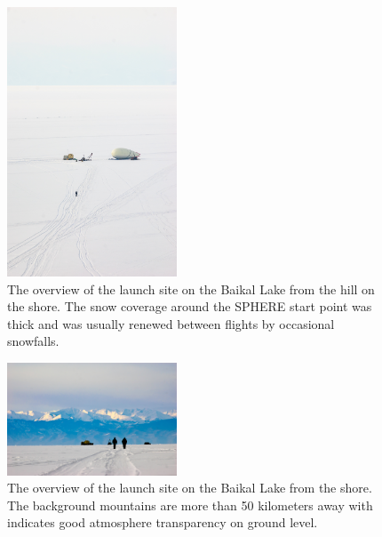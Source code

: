 \documentclass[final,5p,times,twocolumn]{elsarticle}
\begin{document}

\begin{figure}[tb]
\begin{center}
    \includegraphics[trim=1cm 5cm 0cm 5cm,clip,width=0.45\textwidth]{DSC_4049.jpg}\hspace{2pc}%
    \caption{The overview of the launch site on the Baikal Lake from the hill on the shore. The snow coverage around the SPHERE start point was thick and was usually renewed between flights by occasional snowfalls.}
\label{fig:baikal_snow}
\end{center}
\end{figure}
\begin{figure}[tb]
\begin{center}
    \includegraphics[width=0.45\textwidth]{DSC_7423.jpg}\hspace{2pc}%
    \caption{The overview of the launch site on the Baikal Lake from the shore. The background mountains are more than 50 kilometers away with indicates good atmosphere transparency on ground level.}
\label{fig:baikal_atmo}
\end{center}
\end{figure}
\end{document}
